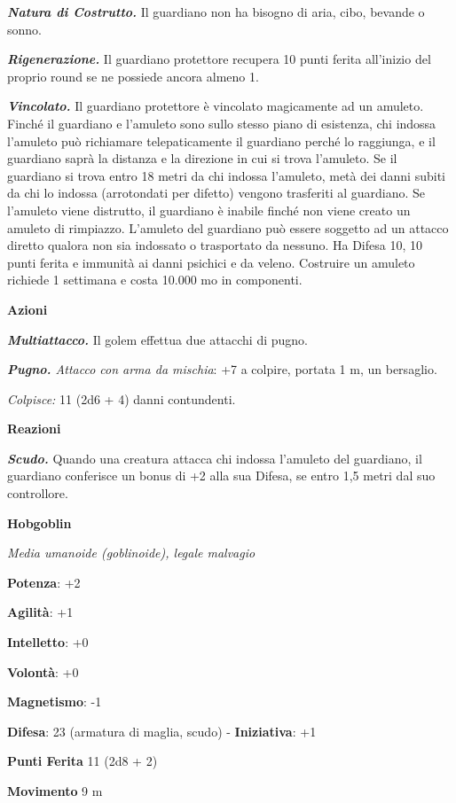 \begin{multicols}{2}
\emph{\textbf{Natura di Costrutto.}} Il guardiano non ha bisogno di
aria, cibo, bevande o sonno.

\emph{\textbf{Rigenerazione.}} Il guardiano protettore recupera 10 punti
ferita all'inizio del proprio round se ne possiede ancora almeno 1.

\emph{\textbf{Vincolato.}} Il guardiano protettore è vincolato
magicamente ad un amuleto. Finché il guardiano e l'amuleto sono sullo
stesso piano di esistenza, chi indossa l'amuleto può richiamare
telepaticamente il guardiano perché lo raggiunga, e il guardiano saprà
la distanza e la direzione in cui si trova l'amuleto. Se il guardiano si
trova entro 18 metri da chi indossa l'amuleto, metà dei danni subiti da
chi lo indossa (arrotondati per difetto) vengono trasferiti al
guardiano. Se l'amuleto viene distrutto, il guardiano è inabile finché
non viene creato un amuleto di rimpiazzo. L'amuleto del guardiano può
essere soggetto ad un attacco diretto qualora non sia indossato o
trasportato da nessuno. Ha Difesa 10, 10 punti ferita e immunità ai danni
psichici e da veleno. Costruire un amuleto richiede 1 settimana e costa
10.000 mo in componenti.

\smallskip\textbf{Azioni}

\emph{\textbf{Multiattacco.}} Il golem effettua due attacchi di pugno.

\emph{\textbf{Pugno.} Attacco con arma da mischia}: +7 a colpire,
portata 1 m, un bersaglio.

\emph{Colpisce:} 11 (2d6 + 4) danni contundenti.

\textbf{Reazioni}

\emph{\textbf{Scudo.}} Quando una creatura attacca chi indossa l'amuleto
del guardiano, il guardiano conferisce un bonus di +2 alla sua Difesa, se
entro 1,5 metri dal suo controllore.

\textbf{Hobgoblin}

\emph{Media umanoide (goblinoide), legale malvagio}

\textbf{Potenza}: +2

\textbf{Agilità}: +1

\textbf{Intelletto}: +0

\textbf{Volontà}: +0

\textbf{Magnetismo}: -1

\textbf{Difesa}: 23 (armatura di maglia, scudo) - \textbf{Iniziativa}: +1

\textbf{Punti Ferita} 11 (2d8 + 2)

\textbf{Movimento} 9 m


\end{multicols}
